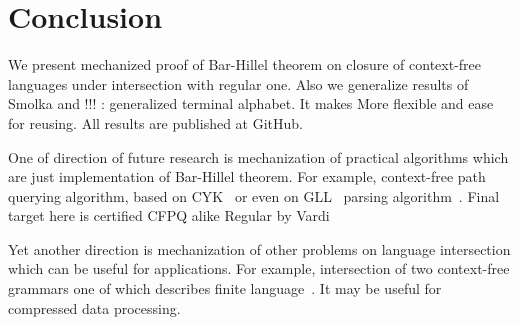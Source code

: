 \section{Conclusion}

We present mechanized proof of Bar-Hillel theorem on closure of context-free languages under intersection with regular one.
Also we generalize results of Smolka and !!! : generalized terminal alphabet. 
It makes More flexible and ease for reusing.
All results are published at GitHub.

One of direction of future research is mechanization of practical algorithms which are just implementation of Bar-Hillel theorem.
For example, context-free path querying algorithm, based on CYK~\cite{Hellings,RDF} or even on GLL~\cite{scott2010gll} parsing algorithm~\cite{grigorev2016context}.
Final target here is certified CFPQ alike Regular by Vardi

Yet another direction is mechanization of other problems on language intersection which can be useful for applications. For example, intersection of two context-free grammars one of which describes finite language~\cite{nederhof2002parsing, nederhof2004language}. It may be useful for compressed data processing.

